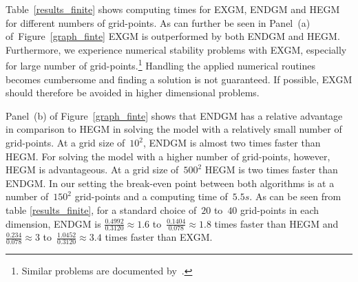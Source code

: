 \documentclass[a4paper,12pt]{article}%
\begin{document}
Table~\ref{results_finite} shows computing times for EXGM, ENDGM and HEGM for different numbers of grid-points. As can further be seen in Panel~(a) of~Figure~\ref{graph_finte} EXGM is outperformed by both ENDGM and HEGM. Furthermore, we experience numerical stability problems with EXGM, especially for large number of grid-points.\footnote{Similar problems are documented by~.}
Handling the applied numerical routines becomes cumbersome and finding a solution is not guaranteed. If possible, EXGM should therefore be avoided in higher dimensional problems.

Panel~(b) of Figure~\ref{graph_finte} shows that ENDGM has a relative advantage in comparison to HEGM in solving the model with a relatively small number of grid-points. At a grid size of~$10^{2}$, ENDGM is almost two times faster than HEGM. For solving the model with a higher number of grid-points, however, HEGM is advantageous. At a grid size of~$500^{2}$ HEGM is two times faster than ENDGM. In our setting the break-even point between both algorithms is at a number of~$150^{2}$ grid-points and a computing time of~$5.5s.$ As can be seen from table \ref{results_finite}, for a standard choice of~$20$ to~$40$ grid-points in each dimension, ENDGM is $\frac{0.4992}{0.3120}\approx1.6$ to~$\frac{0.1404}{0.078}\approx1.8$ times faster than HEGM and $\frac{0.234}{0.078}\approx3$ to~$\frac{1.0452}{0.3120}\approx3.4$ times faster than EXGM.
\end{document}
